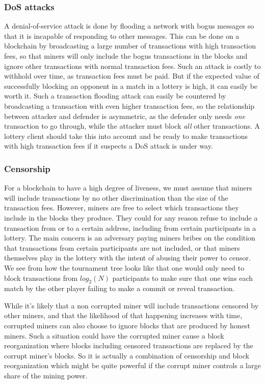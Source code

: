\subsubsection{DoS attacks}
A denial-of-service attack is done by flooding a network with bogus messages so that it is incapable of responding to other messages. This can be done on a blockchain by broadcasting a large number of transactions with high transaction fees, so that miners will only include the bogus transactions in the blocks and ignore other transactions with normal transaction fees. Such an attack is costly to withhold over time, as transaction fees must be paid. But if the expected value of successfully blocking an opponent in a match in a lottery is high, it can easily be worth it. Such a transaction flooding attack can easily be countered by broadcasting a transaction with even higher transaction fees, so the relationship between attacker and defender is asymmetric, as the defender only needs \emph{one} transaction to go through, while the attacker must block \emph{all} other transactions. A lottery client should take this into account and be ready to make transactions with high transaction fees if it suspects a DoS attack is under way.

\subsubsection{Censorship}
For a blockchain to have a high degree of liveness, we must assume that miners will include transactions by no other discrimination than the size of the transaction fees. However, miners are free to select which transactions they include in the blocks they produce. They could for any reason refuse to include a transaction from or to a certain address, including from certain participants in a lottery. The main concern is an adversary paying miners bribes on the condition that transactions from certain participants are not included, or that miners themselves play in the lottery with the intent of abusing their power to censor. We see from how the tournament tree looks like that one would only need to block transactions from $log_2(N)$ participants to make sure that one wins each match by the other player failing to make a commit or reveal transaction. 

While it's likely that a non corrupted miner will include transactions censored by other miners, and that the likelihood of that happening increases with time, corrupted miners can also choose to ignore blocks that are produced by honest miners. Such a situation could have the corrupted miner cause a block reorganization where blocks including censored transactions are replaced by the corrupt miner's blocks. So it is actually a combination of censorship and block reorganization which might be quite powerful if the corrupt miner controls a large share of the mining power.

